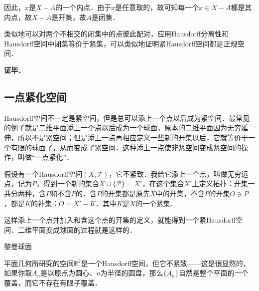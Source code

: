 因此，$x$是$X-A$的一个内点．由于$x$是任意取的，故可知每一个$x\in X-A$都是其内点，故$X-A$是开集，故$A$是闭集．

类似地可以对两个不相交的闭集中的点彼此配对，应用Hausdorff分离性和Hausdorff空间中闭集等价于紧集，可以类似地证明紧Hausdorff空间都是正规空间．


\textbf{证毕．}

\subsection{一点紧化空间}

Hausdorff空间不一定是紧空间，但是总可以添上一个点以后成为紧空间．最常见的例子就是二维平面添上一个点以后成为一个球面，原本的二维平面因为无穷延伸，所以不是紧空间；但是添上一点再相应定义一些新的开集以后，它就等价于一个有限的球面了，从而变成了紧空间．这种添上一点使非紧空间变成紧空间的操作，叫做“一点紧化”．

假设有一个Hausdorff空间$(X, \mathcal{T})$，它不紧致．我给它添上一个点，叫做无穷远点，记为$P$，得到一个新的集合$X\cup \{\mathcal{P}\}=X'$，在这个集合$X'$上定义拓扑：开集一共分两种，含$P$和不含$P$的．含$P$的开集都是原先$X$中的开集，不含$P$的开集$O\ni P$，都是$K$的补集：$O=X'-K$．其中$K$是$X$的一个紧集．

这样添上一个点并加入和含这个点的开集的定义，就能得到一个紧Hausdorff空间．二维平面变成球面的过程就是这样的．

\begin{example}{黎曼球面}

平面几何所研究的空间$\mathbb{R}^2$是一个Hausdorff空间，但它不紧致——这是很显然的，如果你取$A_n$是以原点为圆心、$n$为半径的圆盘，那么$\{A_n\}$自然是整个平面的一个覆盖，而它不存在有限子覆盖．

\end{example}